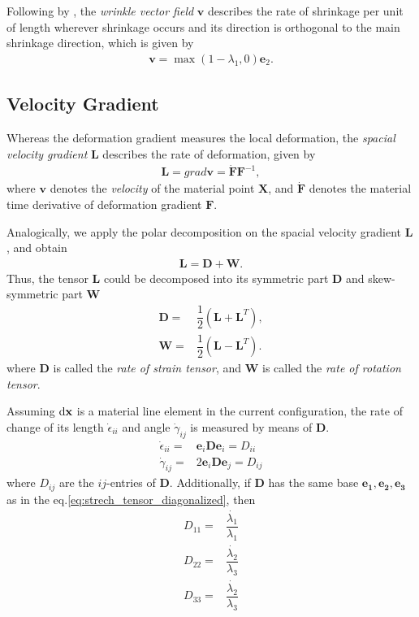 \documentclass{llncs}
\begin{document}
Following by \cite{rohmer2010animation}, the \emph{wrinkle vector field} $\mathbf{v}$ describes the rate of shrinkage per unit of length wherever shrinkage occurs and its direction is orthogonal to the
main shrinkage direction, which is given by
\begin{align}
\mathbf{v}=\max (1-\lambda_1,0) \mathbf{e}_2.
\end{align}

\subsection{Velocity Gradient}
Whereas the deformation gradient measures the local deformation, the \emph{spacial velocity gradient} $\mathbf{L}$ describes the rate of deformation, given by
\begin{align}
\mathbf{L} = grad \bm{v} = \dot{\mathbf{F}} \mathbf{F}^{-1},
\end{align}
where $\bm{v}$ denotes the \emph{velocity} of the material point $\mathbf{X}$, and $\dot{\mathbf{F}}$ denotes the material time derivative of deformation gradient $\mathbf{F}$. 

Analogically, we apply the polar decomposition on the spacial velocity gradient $\mathbf{L}$\cite{liu2002continuum}, and obtain
\begin{align}
\mathbf{L} = \mathbf{D}+\mathbf{W}.
\end{align}
Thus, the tensor $\mathbf{L}$ could be decomposed into its symmetric part $\mathbf{D}$ and skew-symmetric part $\mathbf{W}$
\begin{align}
\mathbf{D}=&\dfrac{1}{2}(\mathbf{L}+\mathbf{L}^T), \\
\mathbf{W}=&\dfrac{1}{2}(\mathbf{L}-\mathbf{L}^T).
\end{align}
where $\mathbf{D}$ is called the \emph{rate of strain tensor}, and $\mathbf{W}$ is called the \emph{rate of rotation tensor}.

Assuming $\rm{d}\mathbf{x}$ is a material line element in the current configuration, the rate of change of its length $\dot{\epsilon}_{ii}$ and angle $\dot{\gamma}_{ij}$ is measured by means of $\mathbf{D}$\cite{haupt2013continuum}.
\begin{align}
\dot{\epsilon}_{ii}=&\mathbf{e}_i\mathbf{D}\mathbf{e}_i=D_{ii} \\
\dot{\gamma}_{ij}=&2\mathbf{e}_i\mathbf{D}\mathbf{e}_j=D_{ij}
\end{align}
where $D_{ij}$ are the $ij$-entries of $\mathbf{D}$. Additionally, if $\mathbf{D}$ has the same base ${\mathbf{e_1},\mathbf{e_2},\mathbf{e_3}}$ as in the eq.\eqref{eq:strech_tensor_diagonalized}, then
\begin{align}
D_{11}=&\dfrac{\dot{\lambda_1}}{\lambda_1} \\
D_{22}=&\dfrac{\dot{\lambda_2}}{\lambda_3} \\
D_{33}=&\dfrac{\dot{\lambda_2}}{\lambda_3} 
\end{align}
\end{document}
